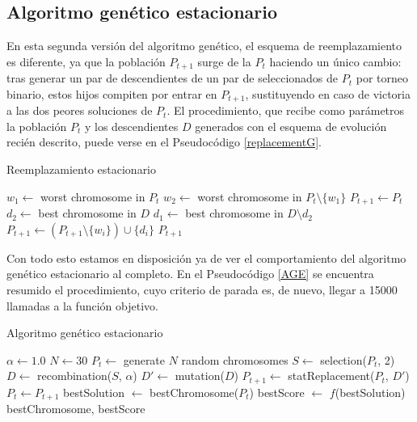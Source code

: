 \documentclass[a4paper, 11pt, titlepage]{article}
\begin{document}
    \subsection{Algoritmo genético estacionario}

    En esta segunda versión del algoritmo genético, el esquema de reemplazamiento es diferente, ya que la población $P_{t+1}$ surge de la $P_t$ haciendo un único cambio: tras generar un par de descendientes de un par de seleccionados de $P_t$ por torneo binario, estos hijos compiten por entrar en $P_{t+1}$, sustituyendo en caso de victoria a las dos peores soluciones de $P_t$. El procedimiento, que recibe como parámetros la población $P_t$ y los descendientes $D$ generados con el esquema de evolución recién descrito, puede verse en el Pseudocódigo \ref{replacementG}.

    \begin{algorithm}
        \caption{Reemplazamiento estacionario}\label{replacementG}
        \begin{algorithmic}[1]
             
            \State $w_1 \gets$ worst chromosome in $P_t$
            \State $w_2 \gets$ worst chromosome in $P_t \setminus \{w_1\}$
            \State $P_{t+1} \gets P_t$
            \State $d_2 \gets$ best chromosome in $D$
            \State $d_1 \gets$ best chromosome in $D \setminus d_2$
                    \State $P_{t+1} \gets (P_{t+1} \setminus \{w_i\}) \cup \{d_i\}$
                \EndIf
            \EndFor
            \State \Return $P_{t+1}$
            \EndFunction
        \end{algorithmic}
    \end{algorithm}

    Con todo esto estamos en disposición ya de ver el comportamiento del algoritmo genético estacionario al completo. En el Pseudocódigo \ref{AGE} se encuentra resumido el procedimiento, cuyo criterio de parada es, de nuevo, llegar a 15000 llamadas a la función objetivo.

    \begin{algorithm}
        \caption{Algoritmo genético estacionario}\label{AGE}
        \begin{algorithmic}[1]
            \State $\alpha \gets 1.0$ 
            \State $N \gets 30$ 
            \State $P_t \gets$ generate $N$ random chromosomes
                \State $S \gets$ selection($P_t$, 2) 
                \State $D \gets$ recombination($S$, $\alpha$)
                \State $D' \gets$ mutation($D$)
                \State $P_{t+1} \gets$ statReplacement($P_t$, $D'$)
                \State $P_t \gets P_{t+1}$
            \EndWhile
            \State bestSolution $\gets$ bestChromosome($P_t$)
            \State bestScore $\gets$ $f$(bestSolution)
            \State \Return bestChromosome, bestScore
            \EndFunction
        \end{algorithmic}
    \end{algorithm}
\end{document}
